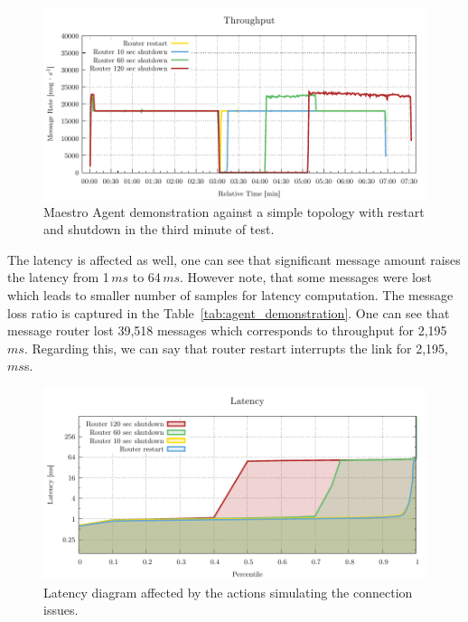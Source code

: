\begin{figure}[H]
	\centering
	\includegraphics[width=1\linewidth]{obrazky-figures/charts/agent-throughput.pdf}
	\caption{Maestro Agent demonstration against a simple topology with restart and shutdown in the third minute of test.}
	\label{fig:agent-throughput}
\end{figure}

The latency is affected as well, one can see that significant message amount raises the latency from 1\,$ms$ to 64\,$ms$. However note, that some messages were lost which leads to smaller number of samples for latency computation. The message loss ratio is captured in the Table~\ref{tab:agent_demonstration}. One can see that message router lost 39,518 messages which corresponds to throughput for 2,195\,$ms$. Regarding this, we can say that router restart interrupts the link for 2,195,$ms$s.

\begin{figure}[H]
	\centering
	\includegraphics[width=1\linewidth]{obrazky-figures/charts/agent-latency.pdf}
	\caption{Latency diagram affected by the actions simulating the connection issues.}
	\label{fig:agent-latency}
\end{figure}

